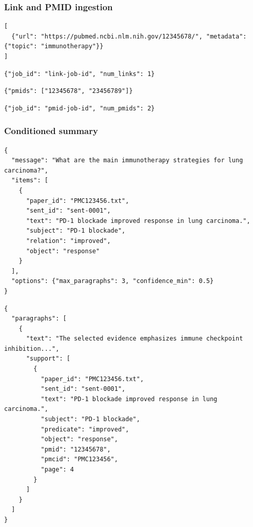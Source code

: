 \documentclass[10pt,letterpaper]{article}
\begin{document}
\subsubsection{Link and PMID ingestion}

\begin{Verbatim}[fontsize=\scriptsize,breaklines=true,breakanywhere=true]
[
  {"url": "https://pubmed.ncbi.nlm.nih.gov/12345678/", "metadata": {"topic": "immunotherapy"}}
]
\end{Verbatim}

\begin{Verbatim}[fontsize=\scriptsize,breaklines=true,breakanywhere=true]
{"job_id": "link-job-id", "num_links": 1}
\end{Verbatim}

\begin{Verbatim}[fontsize=\scriptsize,breaklines=true,breakanywhere=true]
{"pmids": ["12345678", "23456789"]}
\end{Verbatim}

\begin{Verbatim}[fontsize=\scriptsize,breaklines=true,breakanywhere=true]
{"job_id": "pmid-job-id", "num_pmids": 2}
\end{Verbatim}

\subsubsection{Conditioned summary}

\begin{Verbatim}[fontsize=\scriptsize,breaklines=true,breakanywhere=true]
{
  "message": "What are the main immunotherapy strategies for lung carcinoma?",
  "items": [
    {
      "paper_id": "PMC123456.txt",
      "sent_id": "sent-0001",
      "text": "PD-1 blockade improved response in lung carcinoma.",
      "subject": "PD-1 blockade",
      "relation": "improved",
      "object": "response"
    }
  ],
  "options": {"max_paragraphs": 3, "confidence_min": 0.5}
}
\end{Verbatim}

\begin{Verbatim}[fontsize=\scriptsize,breaklines=true,breakanywhere=true]
{
  "paragraphs": [
    {
      "text": "The selected evidence emphasizes immune checkpoint inhibition...",
      "support": [
        {
          "paper_id": "PMC123456.txt",
          "sent_id": "sent-0001",
          "text": "PD-1 blockade improved response in lung carcinoma.",
          "subject": "PD-1 blockade",
          "predicate": "improved",
          "object": "response",
          "pmid": "12345678",
          "pmcid": "PMC123456",
          "page": 4
        }
      ]
    }
  ]
}
\end{Verbatim}
\end{document}
